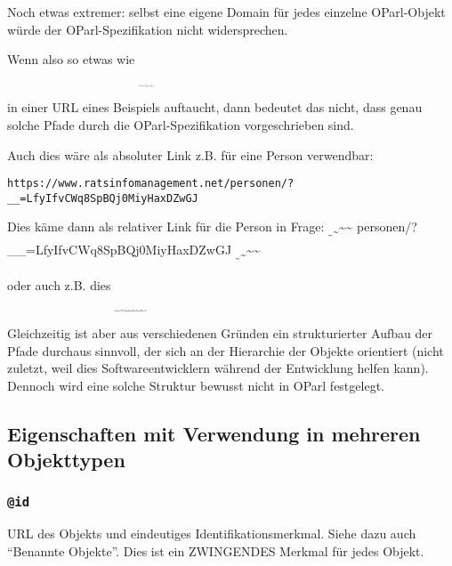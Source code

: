 \documentclass[,a4paper]{article}
\begin{document}
Noch etwas extremer: selbst eine eigene Domain für jedes einzelne
OParl-Objekt würde der OParl-Spezifikation nicht widersprechen.

Wenn also so etwas wie
\textsubscript{\textsubscript{\textsubscript{\textsubscript{\textsubscript{\textsubscript{\textsubscript{\textsubscript{\textsubscript{\textsubscript{
bodies/0/peoples/ }}}}}}}}}}

in einer URL eines Beispiels auftaucht, dann bedeutet das nicht, dass
genau solche Pfade durch die OParl-Spezifikation vorgeschrieben sind.

Auch dies wäre als absoluter Link z.B. für eine Person verwendbar:

\begin{verbatim}
https://www.ratsinfomanagement.net/personen/?__=LfyIfvCWq8SpBQj0MiyHaxDZwGJ
\end{verbatim}

Dies käme dann als relativer Link für die Person in Frage:
\textsubscript{\textsubscript{\textasciitilde{}}\textasciitilde{}}\textasciitilde{}\textasciitilde{}
personen/?\_\_=LfyIfvCWq8SpBQj0MiyHaxDZwGJ
\textsubscript{\textsubscript{\textasciitilde{}}\textasciitilde{}}\textasciitilde{}\textasciitilde{}

oder auch z.B. dies
\textsubscript{\textsubscript{\textsubscript{\textsubscript{\textsubscript{\textsubscript{\textsubscript{\textsubscript{\textsubscript{\textsubscript{
LfyIfvCWq8SpBQj0MiyHaxDZwGJ }}}}}}}}}}

Gleichzeitig ist aber aus verschiedenen Gründen ein strukturierter
Aufbau der Pfade durchaus sinnvoll, der sich an der Hierarchie der
Objekte orientiert (nicht zuletzt, weil dies Softwareentwicklern während
der Entwicklung helfen kann). Dennoch wird eine solche Struktur bewusst
nicht in OParl festgelegt.

\subsection{Eigenschaften mit Verwendung in mehreren
Objekttypen}\label{eigenschaften-mit-verwendung-in-mehreren-objekttypen}

\subsubsection{\texttt{@id}}\label{id}

URL des Objekts und eindeutiges Identifikationsmerkmal. Siehe dazu auch
``Benannte Objekte''. Dies ist ein ZWINGENDES Merkmal für jedes Objekt.
\end{document}
